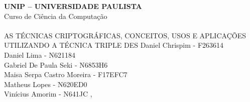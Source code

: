 
\frenchspacing 

\newpage

\pretextual

\begin{capa} 
    \begin{center}
        \begin{minipage}{1\textwidth} 
            \large\centering{}
        \end{minipage}
    \end{center}
    \begin{center}
        \LARGE\textbf{UNIP – UNIVERSIDADE PAULISTA\\} 
        \LARGE Curso de Ciência da Computação\\
        \vfill
        \ABNTEXchapterfont\Large\textbf{\MakeUppercase{\imprimirtitulo}}
        \\\small{AS TÉCNICAS CRIPTOGRÁFICAS, CONCEITOS, USOS E APLICAÇÕES\\UTILIZANDO A TÉCNICA TRIPLE DES} 
        \vfill
        \normalsize
        Daniel Chrispim - F263614\\
        Daniel Lima - N621184\\
        Gabriel De Paula Seki - N6853H6\\
        Maisa Serpa Castro Moreira - F17EFC7\\
        Matheus Lopes - N620ED0\\
        Vinícius Amorim - N641JC
        \vfill
        \imprimirlocal, \imprimirdata 
    \end{center}
\end{capa}

